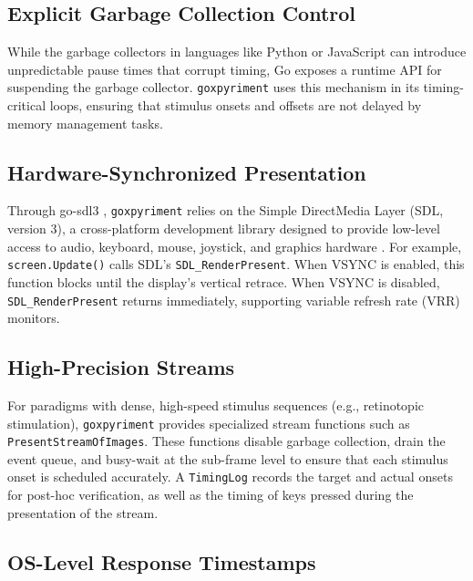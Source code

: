 \documentclass[man,a4paper]{apa7}
\begin{document}
\subsection{Explicit Garbage Collection Control}\label{explicit-gc-control}

While the garbage collectors in languages like Python or JavaScript can
introduce unpredictable pause times that corrupt timing, Go exposes a runtime
API for suspending the garbage collector. \texttt{goxpyriment} uses this
mechanism in its timing-critical loops, ensuring that stimulus onsets and
offsets are not delayed by memory management tasks.

\subsection{Hardware-Synchronized Presentation}\label{hardware-sync}

Through go-sdl3 \parencite{gosdl3}, \texttt{goxpyriment} relies on the
Simple DirectMedia Layer (SDL, version 3), a cross-platform development
library designed to provide low-level access to audio, keyboard,
mouse, joystick, and graphics hardware \parencite{sdl3}. For example,
\texttt{screen.Update()} calls SDL's \texttt{SDL\_RenderPresent}. When
VSYNC is enabled, this function blocks until the display's
vertical retrace. When VSYNC is disabled, \texttt{SDL\_RenderPresent}
returns immediately, supporting variable refresh rate (VRR)
monitors.

\subsection{High-Precision Streams}\label{high-precision-streams}

For paradigms with dense, high-speed stimulus sequences (e.g., retinotopic stimulation),
\texttt{goxpyriment} provides specialized stream functions such as
\texttt{PresentStreamOfImages}. These functions disable garbage collection,
drain the event queue, and busy-wait at the sub-frame level to ensure
that each stimulus onset is scheduled accurately. A \texttt{TimingLog}
records the target and actual onsets for post-hoc verification, as
well as the timing of keys pressed during the presentation of the
stream.

\subsection{OS-Level Response Timestamps}\label{hardware-timestamps}
\end{document}
